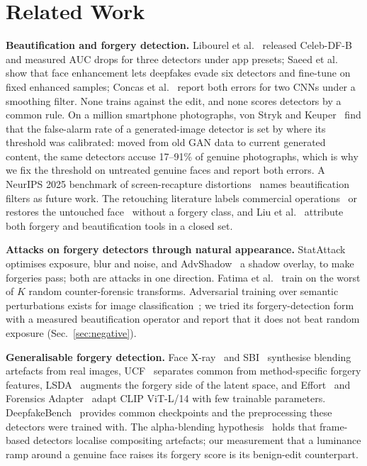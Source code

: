 \documentclass[conference]{IEEEtran}
\begin{document}
\section{Related Work}
\textbf{Beautification and forgery detection.} Libourel et al.~\cite{libourel2024} released Celeb-DF-B and measured AUC
drops for three detectors under app presets; Saeed et al.~\cite{saeed2025} show that face enhancement lets deepfakes evade
six detectors and fine-tune on fixed enhanced samples; Concas et al.~\cite{concas2025} report both errors for two CNNs
under a smoothing filter. None trains against the edit, and none scores detectors by a common rule. On a million
smartphone photographs, von Stryk and Keuper~\cite{laionmobile2026} find that the false-alarm rate of a generated-image
detector is set by where its threshold was calibrated: moved from old GAN data to current generated content, the same
detectors accuse 17--91\% of genuine photographs, which is why we fix the threshold on untreated genuine faces and
report both errors. A NeurIPS 2025
benchmark of screen-recapture distortions~\cite{moire2025} names beautification filters as future work. The retouching
literature labels commercial operations~\cite{retouchingffhq} or restores the untouched face~\cite{frrffusion,mofrr,reface,wang2019photoshop}
without a forgery class, and Liu et al.~\cite{miea2026} attribute both forgery and beautification tools in a closed set.

\textbf{Attacks on forgery detectors through natural appearance.} StatAttack~\cite{statattack2023} optimises exposure,
blur and noise, and AdvShadow~\cite{advshadow2024} a shadow overlay, to make forgeries pass; both are attacks in one
direction. Fatima et al.~\cite{fatima2025} train on the worst of $K$ random counter-forensic transforms. Adversarial
training over semantic perturbations exists for image classification~\cite{hosseini2018,laidlaw2019,gat2023,ava2021}; we
tried its forgery-detection form with a measured beautification operator and report that it does not beat random
exposure (Sec.~\ref{sec:negative}).

\textbf{Generalisable forgery detection.} Face X-ray~\cite{facexray} and SBI~\cite{sbi} synthesise blending artefacts
from real images, UCF~\cite{ucf} separates common from method-specific forgery features, LSDA~\cite{lsda} augments the
forgery side of the latent space, and Effort~\cite{effort} and Forensics Adapter~\cite{forensicsadapter} adapt CLIP
ViT-L/14 with few trainable parameters. DeepfakeBench~\cite{deepfakebench} provides common checkpoints and the
preprocessing these detectors were trained with. The alpha-blending hypothesis~\cite{alphablend2026} holds that
frame-based detectors localise compositing artefacts; our measurement that a luminance ramp around a genuine face raises
its forgery score is its benign-edit counterpart.
\end{document}
